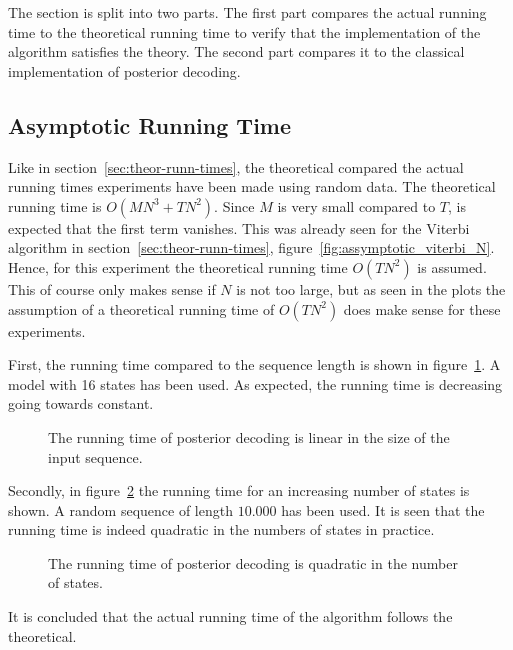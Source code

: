 The section is split into two parts. The first part compares the actual
running time to the theoretical running time to verify that the implementation
of the algorithm satisfies the theory. The second part compares it to the
classical implementation of posterior decoding.

\subsection{Asymptotic Running Time}
\label{sec:asympt-runn-time}

Like in section~\ref{sec:theor-runn-times}, the theoretical compared the actual
running times experiments have been made using random data. The theoretical
running time is $O(M N^3 + TN^2)$. Since $M$ is very small compared to $T$, is
expected that the first term vanishes. This was already seen for the Viterbi
algorithm in section~\ref{sec:theor-runn-times},
figure~\ref{fig:assymptotic_viterbi_N}. Hence, for this experiment the
theoretical running time $O(TN^2)$ is assumed. This of course only makes sense
if $N$ is not too large, but as seen in the plots the assumption of a
theoretical running time of $O(TN^2)$ does make sense for these experiments.

First, the running time compared to the sequence length is shown in
figure~\ref{fig:posterior_T}. A model with 16 states has been used. As expected,
the running time is decreasing going towards constant.

\begin{figure}
  \centering
  
  \caption{The running time of posterior decoding is linear in the size of the
    input sequence.}
  \label{fig:posterior_T}
\end{figure}

Secondly, in figure~\ref{fig:posterior_N} the running time for an increasing
number of states is shown. A random sequence of length $10.000$ has been used. It
is seen that the running time is indeed quadratic in the numbers of states
in practice.

\begin{figure}
  \centering
  
  \caption{The running time of posterior decoding is quadratic in the number of
    states.}
  \label{fig:posterior_N}
\end{figure}

It is concluded that the actual running time of the algorithm follows the
theoretical.

